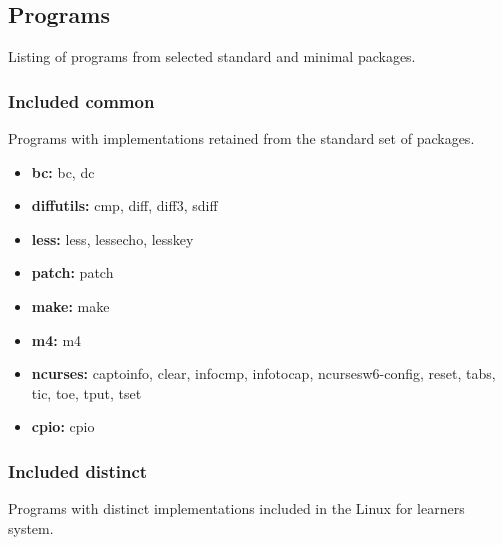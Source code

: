 \subsection{Programs}\label{Programs}

Listing of programs from selected standard and minimal packages.

\subsubsection{Included common}

Programs with implementations retained from the standard set of packages.

\begin{itemize}
    \item \textbf{bc:} bc, dc
    \item \textbf{diffutils:} cmp, diff, diff3, sdiff
    \item \textbf{less:} less, lessecho, lesskey
    \item \textbf{patch:} patch
    \item \textbf{make:} make
    \item \textbf{m4:} m4
    \item \textbf{ncurses:} captoinfo, clear, infocmp, infotocap, ncursesw6-config, reset, tabs, tic, toe, tput, tset
    \item \textbf{cpio:} cpio
\end{itemize}


\subsubsection{Included distinct}

Programs with distinct implementations included in the Linux for learners system.

